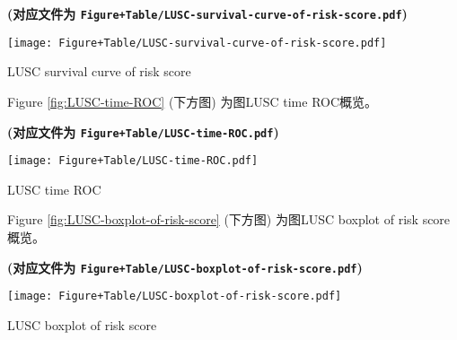 \documentclass[
]{article}
\begin{document}
\textbf{(对应文件为 \texttt{Figure+Table/LUSC-survival-curve-of-risk-score.pdf})}

\def\@captype{figure}
\begin{center}
\texttt{[image: Figure+Table/LUSC-survival-curve-of-risk-score.pdf]}
\caption{LUSC survival curve of risk score}\label{fig:LUSC-survival-curve-of-risk-score}
\end{center}

\begin{center}\vspace{1.5cm}\end{center}

\begin{center}\vspace{1.5cm}\end{center}

Figure \ref{fig:LUSC-time-ROC} (下方图) 为图LUSC time ROC概览。

\textbf{(对应文件为 \texttt{Figure+Table/LUSC-time-ROC.pdf})}

\def\@captype{figure}
\begin{center}
\texttt{[image: Figure+Table/LUSC-time-ROC.pdf]}
\caption{LUSC time ROC}\label{fig:LUSC-time-ROC}
\end{center}

\begin{center}\vspace{1.5cm}\end{center}

\begin{center}\vspace{1.5cm}\end{center}

Figure \ref{fig:LUSC-boxplot-of-risk-score} (下方图) 为图LUSC boxplot of risk score概览。

\textbf{(对应文件为 \texttt{Figure+Table/LUSC-boxplot-of-risk-score.pdf})}

\def\@captype{figure}
\begin{center}
\texttt{[image: Figure+Table/LUSC-boxplot-of-risk-score.pdf]}
\caption{LUSC boxplot of risk score}\label{fig:LUSC-boxplot-of-risk-score}
\end{center}

\begin{center}\vspace{1.5cm}\end{center}
\end{document}
